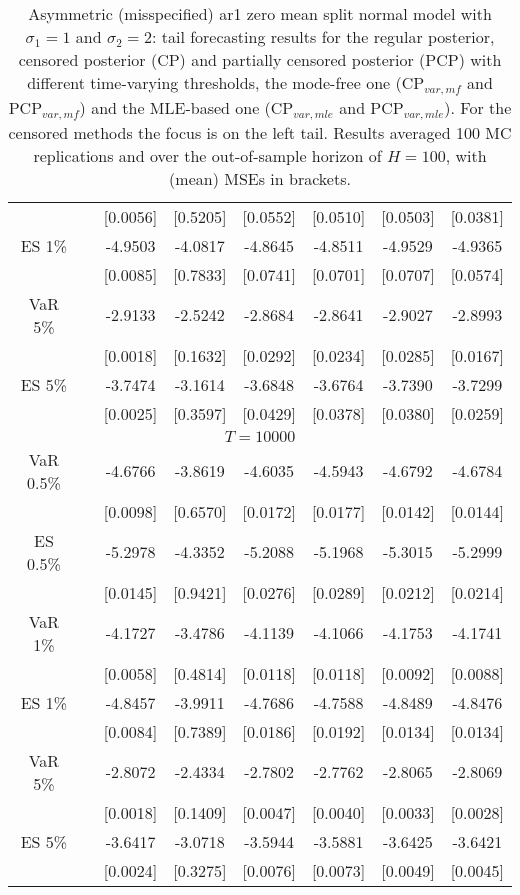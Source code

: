 {{\begin{table}
\begin{tabular}{cc cccccc}
  && [0.0056] & [0.5205] & [0.0552] & [0.0510] & [0.0503] & [0.0381] \\ 
\rowcolor{LightCyan} 
ES 1\% && -4.9503 & -4.0817 & -4.8645 & -4.8511 & -4.9529 & -4.9365 \\ 
  && [0.0085] & [0.7833] & [0.0741] & [0.0701] & [0.0707] & [0.0574] \\ [1ex]
\rowcolor{LightCyan} 
VaR 5\% && -2.9133 & -2.5242 & -2.8684 & -2.8641 & -2.9027 & -2.8993 \\ 
 && [0.0018] & [0.1632] & [0.0292] & [0.0234] & [0.0285] & [0.0167] \\ 
\rowcolor{LightCyan} 
ES 5\% && -3.7474 & -3.1614 & -3.6848 & -3.6764 & -3.7390 & -3.7299 \\ 
 && [0.0025] & [0.3597] & [0.0429] & [0.0378] & [0.0380] & [0.0259] \\ 
\hline 
\multicolumn{8}{c}{$T =10000$}  \\ 
\hline 
\rowcolor{LightCyan} 
VaR 0.5\% && -4.6766 & -3.8619 & -4.6035 & -4.5943 & -4.6792 & -4.6784 \\ 
  && [0.0098] & [0.6570] & [0.0172] & [0.0177] & [0.0142] & [0.0144] \\ 
\rowcolor{LightCyan} 
ES 0.5\% && -5.2978 & -4.3352 & -5.2088 & -5.1968 & -5.3015 & -5.2999 \\ 
  && [0.0145] & [0.9421] & [0.0276] & [0.0289] & [0.0212] & [0.0214] \\ [1ex]
\rowcolor{LightCyan} 
VaR 1\% && -4.1727 & -3.4786 & -4.1139 & -4.1066 & -4.1753 & -4.1741 \\ 
  && [0.0058] & [0.4814] & [0.0118] & [0.0118] & [0.0092] & [0.0088] \\ 
\rowcolor{LightCyan} 
ES 1\% && -4.8457 & -3.9911 & -4.7686 & -4.7588 & -4.8489 & -4.8476 \\ 
  && [0.0084] & [0.7389] & [0.0186] & [0.0192] & [0.0134] & [0.0134] \\ [1ex]
\rowcolor{LightCyan} 
VaR 5\% && -2.8072 & -2.4334 & -2.7802 & -2.7762 & -2.8065 & -2.8069 \\ 
 && [0.0018] & [0.1409] & [0.0047] & [0.0040] & [0.0033] & [0.0028] \\ 
\rowcolor{LightCyan} 
ES 5\% && -3.6417 & -3.0718 & -3.5944 & -3.5881 & -3.6425 & -3.6421 \\ 
 && [0.0024] & [0.3275] & [0.0076] & [0.0073] & [0.0049] & [0.0045] \\ 
\hline 
\end{tabular}
 \caption{Asymmetric (misspecified) ar1 zero mean split normal model with $\sigma_{1} = 1$ and $\sigma_{2} = 2$:  tail forecasting results for the regular posterior, censored posterior (CP)  and partially censored posterior (PCP) with different time-varying thresholds,  the mode-free one (CP$_{var,mf}$ and PCP$_{var,mf}$) and  the MLE-based one (CP$_{var,mle}$ and PCP$_{var,mle }$).  For the censored methods the focus is on the left tail.  Results averaged 100 MC replications and over the out-of-sample horizon of $H=100$,  with (mean) MSEs in brackets.} 
\label{tab:ar1_s2_pcp_var_es_varc}  
\end{table}
}}